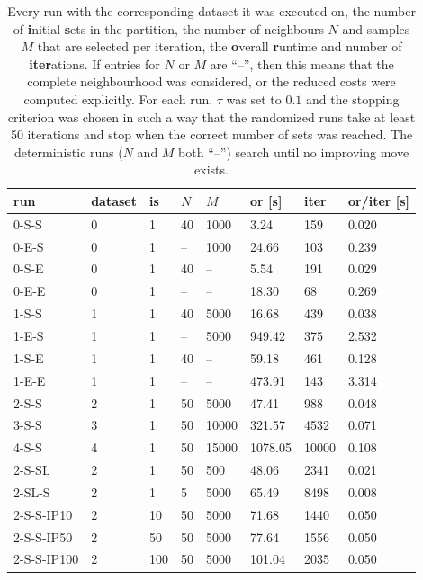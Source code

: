 \begin{table}[ht]
    \centering
    \captionsetup{width=.9\linewidth}
    \begin{tabular}{l|llll|lll}
        run & dataset & {\bf is} & $N$ & $M$ & {\bf or} [s] & {\bf iter} & {\bf or}/{\bf iter} [s] \\
        \hline 
        0-S-S  & 0 & 1 & 40 &  1000       & 3.24 & 159 & 0.020       \\   
        0-E-S  & 0 & 1 & -- &  1000       & 24.66 & 103 & 0.239      \\   
        0-S-E  & 0 & 1 & 40 &  --         & 5.54 & 191 & 0.029       \\   
        0-E-E  & 0 & 1 & -- &  --         & 18.30 & 68 & 0.269       \\ 
        \hline 
        1-S-S  & 1 & 1 & 40 &  5000       & 16.68 & 439 & 0.038      \\   
        1-E-S  & 1 & 1 & -- &  5000       & 949.42 & 375 & 2.532     \\   
        1-S-E  & 1 & 1 & 40 &  --         & 59.18 & 461 & 0.128      \\   
        1-E-E  & 1 & 1 & -- &  --         & 473.91 & 143 & 3.314     \\   
        \hline
        2-S-S  & 2 & 1 & 50 &  5000       & 47.41 & 988 & 0.048      \\   
        3-S-S  & 3 & 1 & 50 & 10000       & 321.57 & 4532 & 0.071    \\   
        4-S-S  & 4 & 1 & 50 & 15000       & 1078.05 & 10000 & 0.108  \\   
        \hline
        2-S-SL & 2 & 1 & 50 &   500       & 48.06 & 2341 & 0.021     \\   
        2-SL-S & 2 & 1 &  5 &  5000       & 65.49 & 8498 & 0.008     \\   
        \hline
        2-S-S-IP10  & 2 &  10 & 50 & 5000 & 71.68 & 1440 & 0.050     \\   
        2-S-S-IP50  & 2 &  50 & 50 & 5000 & 77.64 & 1556 & 0.050     \\   
        2-S-S-IP100 & 2 & 100 & 50 & 5000 & 101.04 & 2035 & 0.050
    \end{tabular}
    \caption{Every run with the corresponding dataset it was executed on, the number of {\bf i}nitial {\bf s}ets in the partition, the number of neighbours $N$ and samples $M$ that are selected per iteration, the {\bf o}verall {\bf r}untime and number of {\bf iter}ations. If entries for $N$ or $M$ are ``--'', then this means that the complete neighbourhood was considered, or the reduced costs were computed explicitly. For each run, $\tau$ was set to $0.1$ and the stopping criterion was chosen in such a way that the randomized runs take at least 50 iterations and stop when the correct number of sets was reached. The deterministic runs ($N$ and $M$ both ``--'') search until no improving move exists.} \label{tab:runs}
\end{table}
